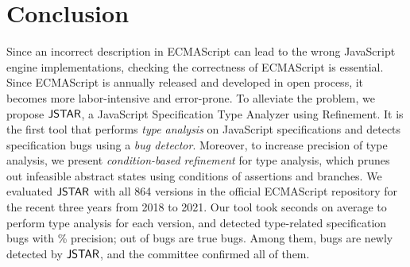 \section{Conclusion}\label{sec:conclusion}
Since an incorrect description in ECMAScript can lead to the wrong JavaScript
engine implementations, checking the correctness of ECMAScript is essential.
Since ECMAScript is annually released and developed in open process, it becomes
more labor-intensive and error-prone.  To alleviate the problem, we propose
$\tool$, a JavaScript Specification Type Analyzer using Refinement.  It is the
first tool that performs \textit{type analysis} on JavaScript specifications and
detects specification bugs using a \textit{bug detector}.  Moreover, to increase
precision of type analysis, we present \textit{condition-based refinement} for
type analysis, which prunes out infeasible abstract states using conditions of
assertions and branches.  We evaluated $\tool$ with all 864 versions in the
official ECMAScript repository for the recent three years from 2018 to 2021.
Our tool took  seconds on average to perform type analysis for each
version, and detected  type-related specification bugs with
\% precision;  out of  bugs are true bugs.
Among them,  bugs are newly detected by $\tool$, and the committee
confirmed all of them.
